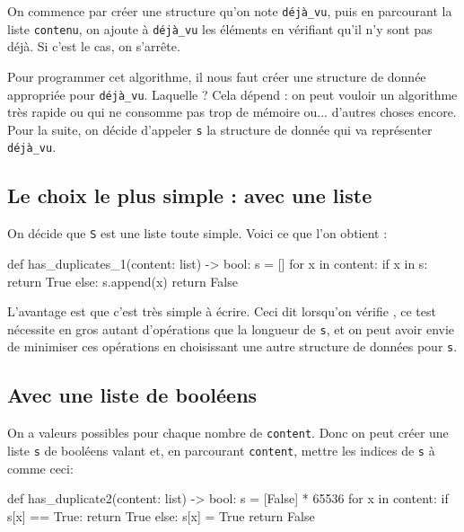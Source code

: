 \documentclass[a4paper,12pt,french]{book}
\begin{document}
On commence par créer une structure qu'on note \texttt{déjà\_vu}, puis en parcourant la liste \texttt{contenu}, on ajoute à \texttt{déjà\_vu} les éléments en vérifiant qu'il n'y sont pas déjà. Si c'est le cas, on s'arrête.

Pour programmer cet algorithme, il nous faut créer une structure de donnée appropriée pour \texttt{déjà\_vu}. Laquelle ? Cela dépend : on peut vouloir un algorithme très rapide ou qui ne consomme pas trop de mémoire ou... d'autres choses encore.\\

Pour la suite, on décide d'appeler \texttt{s} la structure de donnée qui va représenter \texttt{déjà\_vu}.
\subsection{Le choix le plus simple : avec une liste}

On décide que \texttt{S} est une liste toute simple. Voici ce que l'on obtient :

\begin{pythoncode}
def has_duplicates_1(content: list) -> bool:
    s = []
    for x in content:
        if x in s:
            return True
        else:
            s.append(x)
    return False
\end{pythoncode}

L'avantage est que c'est très simple à écrire. Ceci dit lorsqu'on vérifie , ce test nécessite en gros autant d'opérations que la longueur de \texttt{s}, et on peut avoir envie de minimiser ces opérations en choisissant une autre structure de données pour \texttt{s}.

\subsection{Avec une liste de booléens}

On a  valeurs possibles pour chaque nombre de \texttt{content}. Donc on peut créer une liste \texttt{s} de  booléens valant  et, en parcourant \texttt{content}, mettre les indices de \texttt{s} à  comme ceci:


\begin{pythoncode}
def has_duplicate2(content: list) -> bool:
    s = [False] * 65536
    for x in content:
        if s[x] == True:
            return True
        else:
            s[x] = True
    return False
\end{pythoncode}
\end{document}
